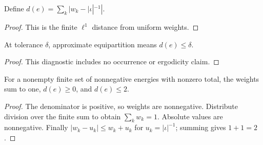 \begin{definition}
\label{def:equip:distance}
Define $d(e)=\sum_k|w_k-|\iota|^{-1}|$.
\end{definition}
\begin{proof}This is the finite $\ell^1$ distance from uniform weights.\end{proof}

\begin{definition}
\label{def:equip:approximate}
At tolerance $\delta$, approximate equipartition means $d(e)\le\delta$.
\end{definition}
\begin{proof}This diagnostic includes no occurrence or ergodicity claim.\end{proof}

\begin{theorem}
\label{thm:physics:equipartition:target}
For a nonempty finite set of nonnegative energies with nonzero total, the weights sum to one, $d(e)\ge0$, and $d(e)\le2$.
\end{theorem}
\begin{proof}
The denominator is positive, so weights are nonnegative. Distribute division over the finite sum to obtain $\sum_kw_k=1$. Absolute values are nonnegative. Finally $|w_k-u_k|\le w_k+u_k$ for $u_k=|\iota|^{-1}$; summing gives $1+1=2$.
\end{proof}

